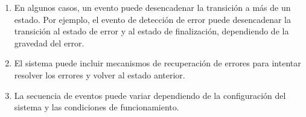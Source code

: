 \documentclass[12pt,a4paper, twoside]{article} %
\begin{document}
\begin{enumerate}
\begin{enumerate}
    \item En algunos casos, un evento puede desencadenar la transición a más de un estado. Por ejemplo, el evento de detección de error puede desencadenar la transición al estado de error y al estado de finalización, dependiendo de la gravedad del error.
    \item El sistema puede incluir mecanismos de recuperación de errores para intentar resolver los errores y volver al estado anterior.
    \item La secuencia de eventos puede variar dependiendo de la configuración del sistema y las condiciones de funcionamiento.
\end{enumerate}

\end{enumerate}
\end{document}
